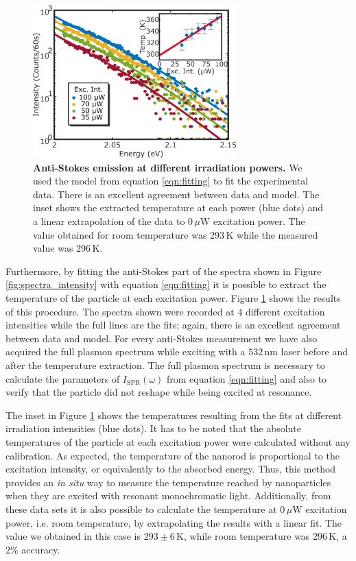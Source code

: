 \documentclass[journal=nalefd,manuscript=letter]{achemso}
\newcommand{\K}{\ensuremath{\,\textrm{K}}}
\newcommand{\nm}{\ensuremath{\,\textrm{nm}}}
\newcommand{\uW}{\ensuremath{\,\mu\textrm{W}}}
\begin{document}
\begin{figure}[tp] \centering
\includegraphics[width=78.4mm]{Figures/03_Fit_Of_AS/03_Log_Fit_AS.png}
\caption{\textbf{Anti-Stokes emission at different irradiation powers.} We used 
the model from equation \ref{eqn:fitting} to fit the experimental data. 
There is an excellent agreement between data and model. The inset shows the extracted
temperature at each power (blue dots) and a linear 
extrapolation of the data to $0\uW$ excitation power.
The value obtained for room temperature was $293\K$ while the measured value was
$296\K$.}
	\label{fig:AS_in_Log}
\end{figure}

Furthermore, by fitting the anti-Stokes part of the spectra shown in Figure
\ref{fig:spectra_intensity} with equation \ref{eqn:fitting} it is possible to extract
the temperature of the particle at each excitation power. Figure
\ref{fig:AS_in_Log} shows the results of this procedure. The spectra shown were
recorded at $4$ different excitation intensities while the full lines are the
fits; again, there is an excellent agreement between data and model. For every
anti-Stokes measurement we have also acquired the full plasmon spectrum while
exciting with a $532\nm$ laser before and after the temperature extraction.
The full plasmon spectrum is necessary to calculate the parameters of
$I_\textrm{SPR}(\omega)$ from equation \ref{eqn:fitting} and also to verify that the
particle did not reshape while being excited at resonance. 

The inset in Figure \ref{fig:AS_in_Log} shows the temperatures resulting from
the fits at different irradiation intensities (blue dots). It has to be noted
that the absolute temperatures of the particle at each excitation power were
calculated without any calibration. As expected, the temperature of the nanorod
is proportional to the excitation intensity, or equivalently to the absorbed
energy. Thus, this method provides an \textit{in situ} way to measure the
temperature reached by nanoparticles when they are excited with resonant
monochromatic light. Additionally, from these data sets it  is also possible to
calculate the temperature at $0\uW$ excitation power, i.e. room temperature, by
extrapolating the results with a linear fit. The value we obtained in this case
is $293\pm 6 \K$, while room temperature was $296\K$, a $2\%$ accuracy.
\end{document}
